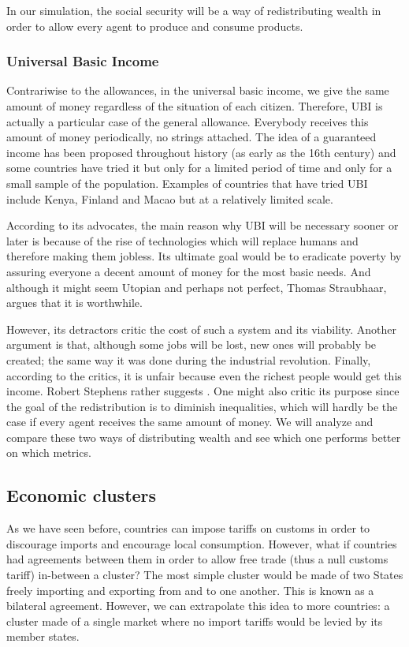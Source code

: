     In our simulation, the social security will be a way of redistributing wealth in order to allow every agent to produce and consume products.
    
    \subsubsection{Universal Basic Income}
    
    Contrariwise to the allowances, in the universal basic income, we give the same amount of money regardless of the situation of each citizen. Therefore, UBI is actually a particular case of the general allowance. Everybody receives this amount of money periodically, no strings attached. The idea of a guaranteed income has been proposed throughout history (as early as the 16th century) and some countries have tried it but only for a limited period of time and only for a small sample of the population. Examples of countries that have tried UBI include Kenya, Finland and Macao but at a relatively limited scale. 
    
    According to its advocates, the main reason why UBI will be necessary sooner or later is because of the rise of technologies which will replace humans and therefore making them jobless. Its ultimate goal would be to eradicate poverty by assuring everyone a decent amount of money for the most basic needs. And although it might seem Utopian and perhaps not perfect, Thomas Straubhaar, argues that it is worthwhile.\cite{straubhaar2017economics}
    
    However, its detractors critic the cost of such a system and its viability. Another argument is that, although some jobs will be lost, new ones will probably be created; the same way it was done during the industrial revolution. Finally, according to the critics, it is unfair because even the richest people would get this income. Robert Stephens rather suggests  \cite{stephens2019universal}. One might also critic its purpose since the goal of the redistribution is to diminish inequalities, which will hardly be the case if every agent receives the same amount of money. We will analyze and compare these two ways of distributing wealth and see which one performs better on which metrics.

    
\subsection{Economic clusters}
    As we have seen before, countries can impose tariffs on customs in order to discourage imports and encourage local consumption. However, what if countries had agreements between them in order to allow free trade (thus a null customs tariff) in-between a cluster? The most simple cluster would be made of two States freely importing and exporting from and to one another. This is known as a bilateral agreement. However, we can extrapolate this idea to more countries: a cluster made of a single market where no import tariffs would be levied by its member states.
    
